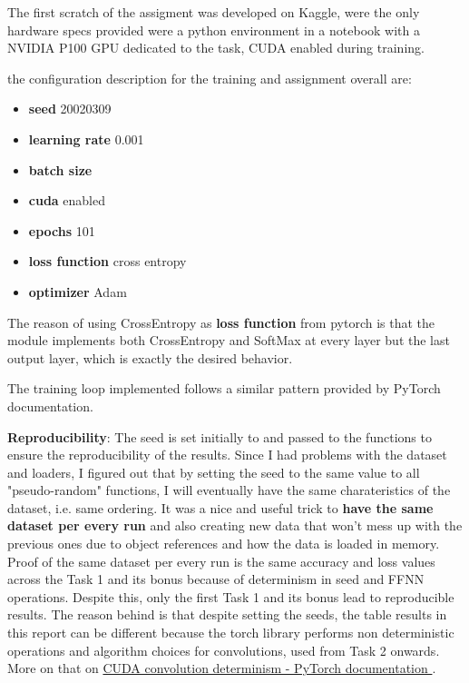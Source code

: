 \documentclass[11pt]{scrartcl}
\begin{document}
The first scratch of the assigment was developed on Kaggle, were the only hardware specs 
provided were a python environment in a notebook with a NVIDIA P100 GPU dedicated to the task,
CUDA enabled during training.

the configuration description for the training and assignment overall are:

\begin{itemize}
	\item \textbf{seed} 20020309 
	\item \textbf{learning rate} 0.001
	\item \textbf{batch size}
	\item \textbf{cuda} enabled
	\item \textbf{epochs} 101
	\item \textbf{loss function} cross entropy 
	\item \textbf{optimizer} Adam
\end{itemize}

The reason of using CrossEntropy as \textbf{loss function} from pytorch is that the 
module implements both CrossEntropy and SoftMax at every layer but the last output layer,
which is exactly the desired behavior.

The training loop implemented follows a similar pattern provided by PyTorch documentation.

\textbf{Reproducibility}:
The seed is set initially to 
and passed to the functions
to ensure the reproducibility of the results.
Since I had problems with the dataset and loaders, 
I figured out that by setting the seed to the same value
to all "pseudo-random" functions,
I will eventually have the same charateristics of the dataset, 
i.e. same ordering.
It was a nice and useful trick to \textbf{have the same dataset per every run}
and also creating new data that won't mess up with the previous ones due to 
object references and how the data is loaded in memory.
Proof of the same dataset per every run is the same accuracy and loss values
across the Task 1 and its bonus because of determinism in seed and FFNN operations.
Despite this, only the first Task 1 and its bonus lead to 
reproducible results.
The reason behind is that despite setting the seeds, 
the table results in this report can be different because
the torch library performs non deterministic operations
and algorithm choices for convolutions, used from Task 2 onwards.
More on that on \href{https://pytorch.org/docs/stable/notes/randomness.html}{
	CUDA convolution determinism - PyTorch documentation
}.
\end{document}
